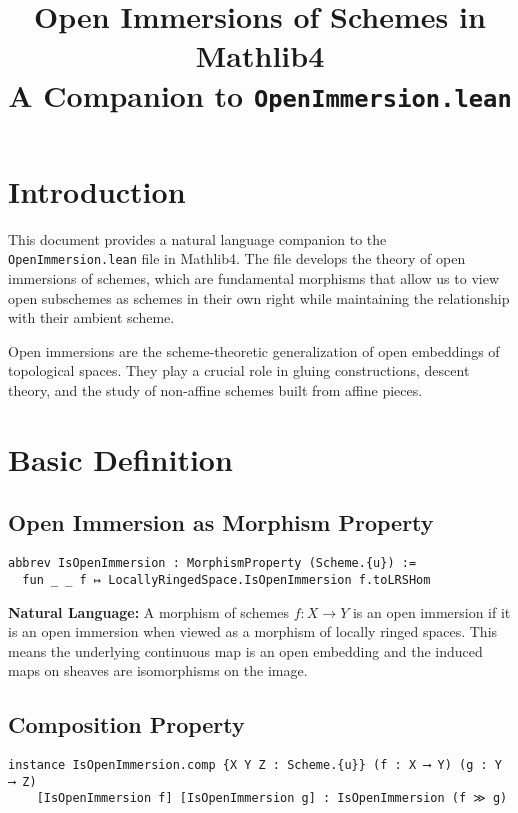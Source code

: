 \documentclass{article}
\title{Open Immersions of Schemes in Mathlib4\\
\large A Companion to \texttt{OpenImmersion.lean}}
\author{}
\date{}
\theoremstyle{definition}
\begin{document}
\maketitle

\section{Introduction}

This document provides a natural language companion to the \texttt{OpenImmersion.lean} file in Mathlib4. The file develops the theory of open immersions of schemes, which are fundamental morphisms that allow us to view open subschemes as schemes in their own right while maintaining the relationship with their ambient scheme.

Open immersions are the scheme-theoretic generalization of open embeddings of topological spaces. They play a crucial role in gluing constructions, descent theory, and the study of non-affine schemes built from affine pieces.

\section{Basic Definition}

\subsection{Open Immersion as Morphism Property}

\begin{lstlisting}
abbrev IsOpenImmersion : MorphismProperty (Scheme.{u}) :=
  fun _ _ f ↦ LocallyRingedSpace.IsOpenImmersion f.toLRSHom
\end{lstlisting}

\textbf{Natural Language:} A morphism of schemes $f: X \to Y$ is an open immersion if it is an open immersion when viewed as a morphism of locally ringed spaces. This means the underlying continuous map is an open embedding and the induced maps on sheaves are isomorphisms on the image.

\subsection{Composition Property}

\begin{lstlisting}
instance IsOpenImmersion.comp {X Y Z : Scheme.{u}} (f : X ⟶ Y) (g : Y ⟶ Z)
    [IsOpenImmersion f] [IsOpenImmersion g] : IsOpenImmersion (f ≫ g)
\end{lstlisting}
\end{document}
